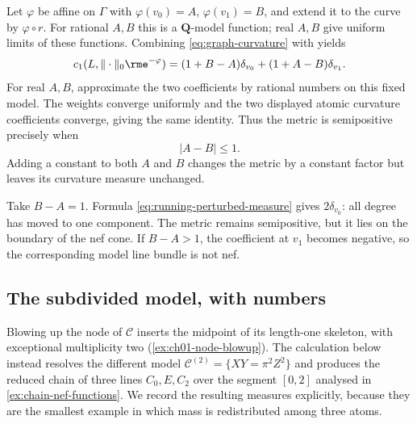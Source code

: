 Let $\varphi$ be affine on $\Gamma$ with
$\varphi(v_0)=A$, $\varphi(v_1)=B$, and extend it to the curve by
$\varphi\circ r$.  For rational $A,B$ this is a $\mathbf Q$-model
function; real $A,B$ give uniform limits of these functions.  Combining
\eqref{eq:graph-curvature} with  yields
\begin{equation}
\label{eq:running-perturbed-measure}
 c_1(L,\|\cdot\|_0\rme^{-\varphi})
 =(1+B-A)\delta_{v_0}+(1+A-B)\delta_{v_1}.
\end{equation}
For real $A,B$, approximate the two coefficients by rational numbers on
this fixed model.  The weights converge uniformly and the two displayed
atomic curvature coefficients converge, giving the same identity.
Thus the metric is semipositive precisely when
\begin{equation}
\label{eq:running-nef-interval}
                               |A-B|\leq1.
\end{equation}
Adding a constant to both $A$ and $B$ changes the metric by a constant factor
but leaves its curvature measure unchanged.

\begin{example}
\label{ex:ch08-boundary-metric}
Take $B-A=1$.  Formula \eqref{eq:running-perturbed-measure} gives
$2\delta_{v_0}$: all degree has moved to one component.  The metric remains
semipositive, but it lies on the boundary of the nef cone.  If $B-A>1$, the
coefficient at $v_1$ becomes negative, so the corresponding model line bundle
is not nef.
\end{example}

\subsection{The subdivided model, with numbers}
\label{sec:ch08-chain-numbers}

Blowing up the node of $\mathcal C$ inserts the midpoint of its length-one
skeleton, with exceptional multiplicity two
(\cref{ex:ch01-node-blowup}).  The calculation below instead resolves the
different model $\mathcal C^{(2)}=\{XY=\pi^2Z^2\}$ and produces the
reduced chain of three lines
$C_0,E,C_2$ over the segment $[0,2]$ analysed in
\cref{ex:chain-nef-functions}.  We record the resulting measures explicitly,
because they are the smallest example in which mass is redistributed among
three atoms.


